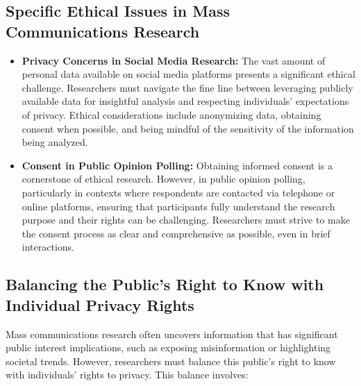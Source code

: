 \documentclass[
]{book}
\begin{document}
\hypertarget{specific-ethical-issues-in-mass-communications-research}{%
\subsection*{Specific Ethical Issues in Mass Communications Research}\label{specific-ethical-issues-in-mass-communications-research}}

\begin{itemize}
\item
  \textbf{Privacy Concerns in Social Media Research:} The vast amount of personal data available on social media platforms presents a significant ethical challenge. Researchers must navigate the fine line between leveraging publicly available data for insightful analysis and respecting individuals' expectations of privacy. Ethical considerations include anonymizing data, obtaining consent when possible, and being mindful of the sensitivity of the information being analyzed.
\item
  \textbf{Consent in Public Opinion Polling:} Obtaining informed consent is a cornerstone of ethical research. However, in public opinion polling, particularly in contexts where respondents are contacted via telephone or online platforms, ensuring that participants fully understand the research purpose and their rights can be challenging. Researchers must strive to make the consent process as clear and comprehensive as possible, even in brief interactions.
\end{itemize}

\hypertarget{balancing-the-publics-right-to-know-with-individual-privacy-rights}{%
\subsection*{Balancing the Public's Right to Know with Individual Privacy Rights}\label{balancing-the-publics-right-to-know-with-individual-privacy-rights}}

Mass communications research often uncovers information that has significant public interest implications, such as exposing misinformation or highlighting societal trends. However, researchers must balance this public's right to know with individuals' rights to privacy. This balance involves:
\end{document}
